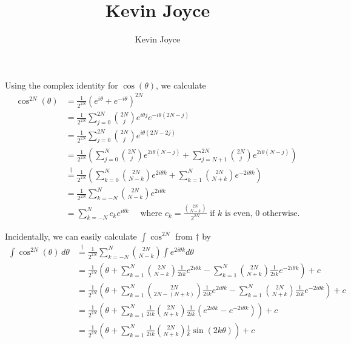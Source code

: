 \documentclass{homework}
\title{Kevin Joyce}
\author{Kevin Joyce}
\begin{document}
 
\newcommand{\figref}[1]{\figurename~\ref{#1}}
\renewcommand{\bar}{\overline}
\renewcommand{\hat}{\widehat}
\renewcommand{\SS}{\mathcal S}
\newcommand{\eps}{\varepsilon}
\newcommand{\TTheta}{\overline{\underline \Theta} }
\newcommand{\del}{\partial}
\newcommand{\approxsim}{\overset{\cdotp}{\underset{\cdotp}{\sim}}}


\begin{solution}
Using the complex identity for $\cos(\theta)$, we calculate
\begin{align*}
  \cos^{2N}(\theta) 
  &= \frac{1}{2^{2N}} (e^{i\theta} + e^{-i\theta})^{2N}\\
  &= \frac{1}{2^{2N}} \sum_{j=0}^{2N} \binom{2N}j e^{i\theta j}e^{-i\theta(2N-j)} \\
  &= \frac{1}{2^{2N}} \sum_{j=0}^{2N} \binom{2N}j e^{i\theta(2N-2j)} \\
  &= \frac{1}{2^{2N}} \left(\sum_{j=0}^{N}\binom{2N}j  e^{2i\theta(N-j)} + \sum_{j=N+1}^{2N}\binom{2N}j  e^{2i\theta(N-j)}\right)\\
  &\stackrel\dagger= \frac{1}{2^{2N}} \left(\sum_{k=0}^{N} \binom{2N}{N-k}e^{2i\theta k} + \sum_{k=1}^{N} \binom{2N}{N+k} e^{-2i\theta k}\right)\\
  &= \frac{1}{2^{2N}} \sum_{k=-N}^{N} \binom{2N}{N-k}e^{2i\theta k} \\
  &= \sum_{k=-N}^N c_k e^{i\theta k} \quad \text{ where } c_k = \frac {\binom{2N}{N-k}}{2^{2N}}\text{ if $k$ is even, $0$ otherwise.}
\end{align*}

Incidentally, we can easily calculate $\int \cos^{2N}$ from $\dagger$ by
\begin{align*}
\int \cos^{2N}(\theta)\, d\theta 
  &\stackrel\dagger= \frac{1}{2^{2N}} \sum_{k=-N}^{N} \binom{2N}{N-k}\int e^{2i\theta k}d\theta \\
  &= \frac{1}{2^{2N}} \left( \theta + \sum_{k=1}^{N} \binom{2N}{N-k}\frac 1{2ik} e^{2i\theta k} - \sum_{k=1}^{N} \binom{2N}{N+k}\frac 1{2ik} e^{-2i\theta k}\right) + c \\
  &= \frac{1}{2^{2N}} \left( \theta + \sum_{k=1}^{N} \binom{2N}{2N - (N+k)}\frac 1{2ik} e^{2i\theta k} - \sum_{k=1}^{N} \binom{2N}{N+k}\frac 1{2ik} e^{-2i\theta k}\right) + c \\
  &= \frac{1}{2^{2N}} \left( \theta + \sum_{k=1}^{N} \frac 1{2ik} \binom{2N}{N+k}\frac 1{2ik} \left(e^{2i\theta k} - e^{-2i\theta k}\right)\right) + c \\
  &= \frac{1}{2^{2N}} \left( \theta + \sum_{k=1}^{N} \frac 1{2ik} \binom{2N}{N+k}\frac 1{k} \sin(2k\theta) \right) + c \\
\end{align*}
\end{solution}
\end{document}

